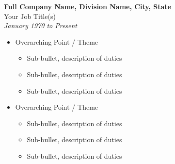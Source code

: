 \bigbreak
\noindent
\textbf{Full Company Name, Division Name, City, State}\\
Your Job Title(s)\\
\textit{January 1970 to Present}
\begin{itemize}[leftmargin=*]
    \item Overarching Point / Theme
    \begin{itemize}
        \item Sub-bullet, description of duties
        \item Sub-bullet, description of duties
        \item Sub-bullet, description of duties
    \end{itemize}

    \medskip
    \item Overarching Point / Theme
    \begin{itemize}
        \item Sub-bullet, description of duties
        \item Sub-bullet, description of duties
        \item Sub-bullet, description of duties
    \end{itemize}
\end{itemize}